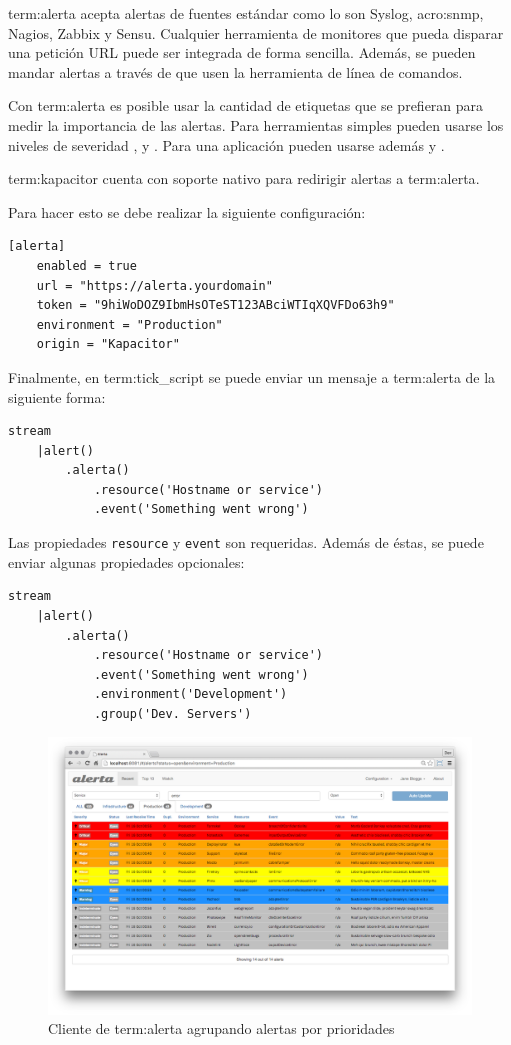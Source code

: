 \gls{term:alerta} acepta alertas de fuentes estándar como lo son Syslog,
\gls{acro:snmp}, Nagios, Zabbix y Sensu. Cualquier herramienta de monitores que
pueda disparar una petición URL puede ser integrada de forma sencilla. Además,
se pueden mandar alertas a través de  que usen la herramienta de línea
de comandos.

Con \gls{term:alerta} es posible usar la cantidad de etiquetas que se prefieran
para medir la importancia de las alertas. Para herramientas simples pueden
usarse los niveles de severidad ,  y . Para
una aplicación pueden usarse además  y .

\gls{term:kapacitor} cuenta con soporte nativo para redirigir alertas a
\gls{term:alerta}.

Para hacer esto se debe realizar la siguiente configuración:

\begin{lstlisting}
[alerta]
    enabled = true
    url = "https://alerta.yourdomain"
    token = "9hiWoDOZ9IbmHsOTeST123ABciWTIqXQVFDo63h9"
    environment = "Production"
    origin = "Kapacitor"
\end{lstlisting}

Finalmente, en \gls{term:tick_script} se puede enviar un mensaje a
\gls{term:alerta} de la siguiente forma:

\begin{lstlisting}
stream
    |alert()
        .alerta()
            .resource('Hostname or service')
            .event('Something went wrong')
\end{lstlisting}

Las propiedades \lstinline{resource} y \lstinline{event} son requeridas. Además de éstas, se puede
enviar algunas propiedades opcionales:

\begin{lstlisting}
stream
    |alert()
        .alerta()
            .resource('Hostname or service')
            .event('Something went wrong')
            .environment('Development')
            .group('Dev. Servers')
\end{lstlisting}


\begin{figure}
  \includegraphics[width=\linewidth]{src/images/06-capitulo-6/alerta.png}
  \caption{Cliente de \gls{term:alerta} agrupando alertas por prioridades}
  \label{fig:alerta}
\end{figure}

